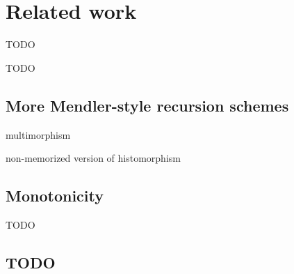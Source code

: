 \chapter{Related work}\label{ch:relwork}

TODO

TODO



\section{More Mendler-style recursion schemes}

multimorphism



non-memorized version of histomorphism

\section{Monotonicity} TODO


\section{TODO}


